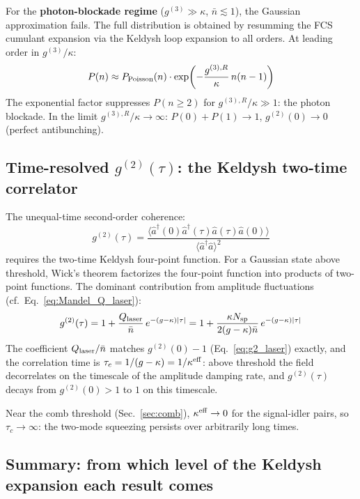 \documentclass[12pt]{article}
\begin{document}
For the \textbf{photon-blockade regime} ($g^{(3)}\gg\kappa$,
$\bar{n}\lesssim 1$), the Gaussian approximation fails.  The full
distribution is obtained by resumming the FCS cumulant expansion via
the Keldysh loop expansion to all orders.  At leading order in
$g^{(3)}/\kappa$:
\begin{equation}
  P(n) \approx P_{\rm Poisson}(n) \cdot
  \exp\!\left(-\frac{g^{(3),R}}{\kappa}\,n(n-1)\right)
  \label{eq:Pn_blockade}
\end{equation}
The exponential factor suppresses $P(n\geq 2)$ for $g^{(3),R}/\kappa\gg 1$:
the photon blockade.  In the limit $g^{(3),R}/\kappa\to\infty$:
$P(0) + P(1) \to 1$, $g^{(2)}(0)\to 0$ (perfect antibunching).

\subsection{Time-resolved $g^{(2)}(\tau)$: the Keldysh two-time correlator}

The unequal-time second-order coherence:
\begin{equation}
  g^{(2)}(\tau) =
  \frac{\langle\hat{a}^\dagger(0)\hat{a}^\dagger(\tau)\hat{a}(\tau)\hat{a}(0)\rangle}
  {\langle\hat{a}^\dagger\hat{a}\rangle^2}
  \label{eq:g2_tau}
\end{equation}
requires the two-time Keldysh four-point function.  For a Gaussian state
above threshold, Wick's theorem factorizes the four-point function into
products of two-point functions.  The dominant contribution from amplitude
fluctuations (cf.\ Eq.~\ref{eq:Mandel_Q_laser}):
\begin{equation}
  g^{(2)}(\tau) = 1 +
  \frac{Q_{\rm laser}}{\bar{n}}\,e^{-(g-\kappa)|\tau|}
  = 1 + \frac{\kappa N_{\rm sp}}{2(g-\kappa)\bar{n}}\,e^{-(g-\kappa)|\tau|}
  \label{eq:g2_tau_result}
\end{equation}
The coefficient $Q_{\rm laser}/\bar{n}$ matches $g^{(2)}(0)-1$
(Eq.~\ref{eq:g2_laser}) exactly, and the correlation time is
$\tau_c = 1/(g-\kappa) = 1/\kappa^{\rm eff}$:
above threshold the field decorrelates on the timescale of the
amplitude damping rate, and $g^{(2)}(\tau)$ decays from
$g^{(2)}(0)>1$ to $1$ on this timescale.

Near the comb threshold (Sec.~\ref{sec:comb}), $\kappa^{\rm eff}\to 0$
for the signal-idler pairs, so $\tau_c\to\infty$: the two-mode squeezing
persists over arbitrarily long times.

\subsection{Summary: from which level of the Keldysh expansion each result comes}
\end{document}

